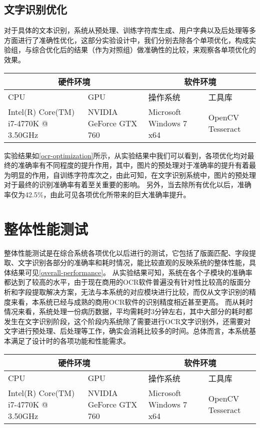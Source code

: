 \subsection{文字识别优化}
对于具体的文本识别，系统从预处理、训练字符库生成、用户字典以及后处理等多方面进行了准确性优化，这部分实验设计中，我们分别去除各个单项优化，构成实验组，与综合优化后的结果（作为对照组）做准确性的比较，来观察各单项优化的效果。
\begin{table}[!htbp]
	\label{ocr-optimization}
	\centering
	\vspace{10pt}
  \renewcommand\arraystretch{1.5}  %
	\begin{tabular}{p{3cm}|p{3cm}|p{3cm}|p{3cm}}
    \hline
    \multicolumn{2}{c|}{硬件环境} & \multicolumn{2}{c}{软件环境} \\
		\hline
    CPU&GPU&操作系统&工具库 \\
		\hline
    Intel(R) Core(TM)  i7-4770K @ 3.50GHz & NVIDIA GeForce  GTX 760 & Microsoft  Windows 7 x64 & OpenCV  Tesseract \\
    \hline
	\end{tabular}
\end{table}
实验结果如\autoref{ocr-optimization}所示，从实验结果中我们可以看到，各项优化均对最终的准确率有不同程度的提升作用，其中，图片的预处理对于准确率的提升有着最为明显的作用，自训练字符库次之，由此可知，在文字识别系统中，图片的预处理对于最终的识别准确率有着至关重要的影响。
另外，当去除所有优化以后，准确率仅为42.5\%，由此可见各项优化所带来的巨大准确率提升。

\section{整体性能测试}
整体性能测试是在综合系统各项优化以后进行的测试，它包括了版面匹配、字段提取、文字识别各部分的准确率和耗时情况，能比较直观的反映系统的整体性能，具体结果可见\autoref{overall-performance}。
从实验结果可知，系统在各个子模块的准确率都达到了较高的水平，由于现在商用的OCR软件普遍没有针对性比较高的版面分析和字段提取解决方案，无法与本系统的对应模块进行比较，而仅从文字识别的精度来看，本系统已经与成熟的商用OCR软件的识别精度相近甚至更高。
而从耗时情况来看，系统处理一份病历数据，平均需耗时3分钟左右，其中大部分的耗时都发生在文字识别阶段，这个阶段内系统除了需要进行OCR文字识别外，还需要对文字进行预处理、后处理等工作，确实会消耗比较多的时间。总体而言，本系统基本满足了设计时的各项功能和性能需求。
\begin{table}[!htbp]
	\label{overall-performance}
	\centering
	\vspace{10pt}
  \renewcommand\arraystretch{1.5}  %
	\begin{tabular}{p{3cm}|p{3cm}|p{3cm}|p{3cm}}
    \hline
    \multicolumn{2}{c|}{硬件环境} & \multicolumn{2}{c}{软件环境} \\
		\hline
    CPU&GPU&操作系统&工具库 \\
		\hline
    Intel(R) Core(TM)  i7-4770K @ 3.50GHz & NVIDIA GeForce  GTX 760 & Microsoft  Windows 7 x64 & OpenCV  Tesseract \\
    \hline
	\end{tabular}
\end{table}


